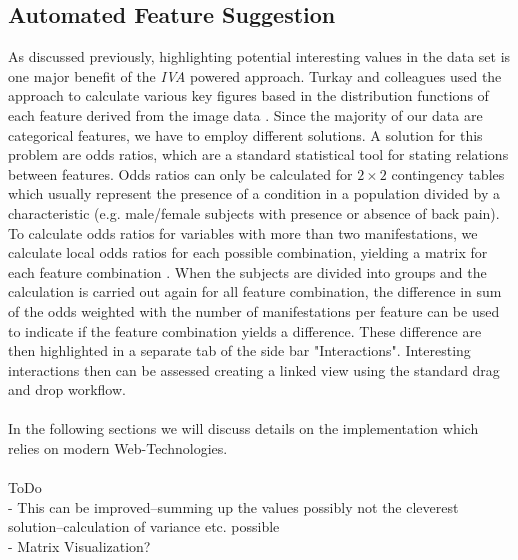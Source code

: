 \documentclass[journal]{style/vgtc} 			          %
\begin{document}
\subsection{Automated Feature Suggestion}
As discussed previously, highlighting potential interesting values in the data set is one major benefit of the \emph{IVA} powered approach.
%
Turkay and colleagues used the approach to calculate various key figures based in the distribution functions of each feature derived from the image data \cite{Turkay2013}.
%
Since the majority of our data are categorical features, we have to employ different solutions.
%
A solution for this problem are odds ratios, which are a standard statistical tool for stating relations between features.
%
Odds ratios can only be calculated for $2\times2$ contingency tables which usually represent the presence of a condition in a population divided by a characteristic (e.g. male/female subjects with presence or absence of back pain).
%
To calculate odds ratios for variables with more than two manifestations, we calculate local odds ratios for each possible combination, yielding a matrix for each feature combination \cite{Rudas1998}.
%
When the subjects are divided into groups and the calculation is carried out again for all feature combination, the difference in sum of the odds weighted with the number of manifestations per feature can be used to indicate if the feature combination yields a difference.
%
These difference are then highlighted in a separate tab of the side bar "Interactions".
%
Interesting interactions then can be assessed creating a linked view using the standard drag and drop workflow.
\\\\
In the following sections we will discuss details on the implementation which relies on modern Web-Technologies.
\\\\
ToDo\\
- This can be improved--summing up the values possibly not the cleverest solution--calculation of variance etc. possible\\
- Matrix Visualization?
\end{document}
